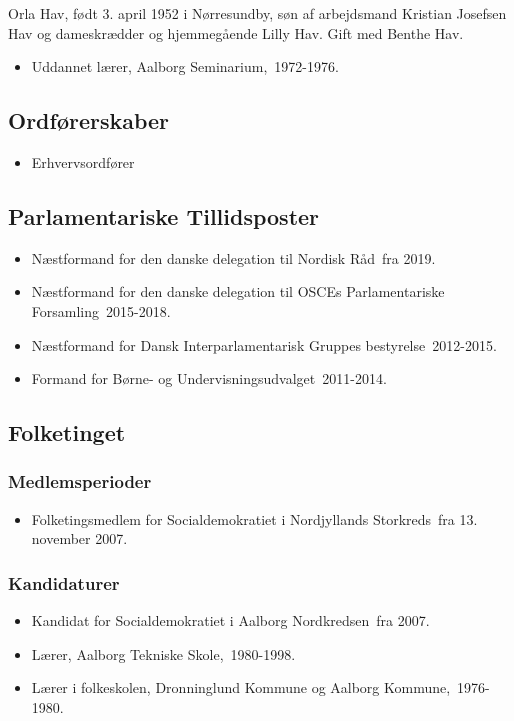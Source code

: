 \documentclass[11pt, a4paper]{awesome-cv}
\begin{document}
\makecvheader[R]
\makelettertitle
\begin{cvletter}
Orla Hav, født 3. april 1952 i Nørresundby, søn af arbejdsmand Kristian Josefsen Hav og dameskrædder og hjemmegående Lilly Hav. Gift med Benthe Hav.

\begin{itemize}
\item Uddannet lærer, Aalborg Seminarium, 1972-1976.
\end{itemize}
\subsection*{Ordførerskaber}
\begin{itemize}
\item Erhvervsordfører
\end{itemize}
\subsection*{Parlamentariske Tillidsposter}
\begin{itemize}
\item Næstformand for den danske delegation til Nordisk Råd fra 2019.
\item Næstformand for den danske delegation til OSCEs Parlamentariske Forsamling 2015-2018.
\item Næstformand for Dansk Interparlamentarisk Gruppes bestyrelse 2012-2015.
\item Formand for Børne- og Undervisningsudvalget 2011-2014.
\end{itemize}
\subsection*{Folketinget}
\subsubsection*{Medlemsperioder}
\begin{itemize}
\item Folketingsmedlem for Socialdemokratiet i Nordjyllands Storkreds fra 13. november 2007.
\end{itemize}
\subsubsection*{Kandidaturer}
\begin{itemize}
\item Kandidat for Socialdemokratiet i Aalborg Nordkredsen fra 2007.
\end{itemize}
\begin{itemize}
\item Lærer, Aalborg Tekniske Skole, 1980-1998.
\item Lærer i folkeskolen, Dronninglund Kommune og Aalborg Kommune, 1976-1980.
\end{itemize}
\end{cvletter}
\end{document}
